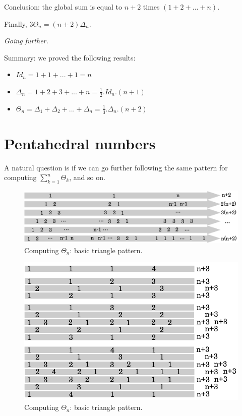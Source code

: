 Conclusion:
the global sum is equal to $n+2$ times $(1+2+...+n)$.

Finally, $3 \Theta_n = (n+2) \Delta_n$.
\medskip

\noindent \textit{Going further.}

Summary: we proved the following results:
\begin{itemize}
\item $Id_n = 1+1+ ... +1 = n$
\item $\Delta_n = 1+2+3+ ... +n = \frac{1}{2}.Id_n.(n+1)$
\item $\Theta_n = \Delta_1 + \Delta_2 + ... + \Delta_n = \frac{1}{3} .\Delta_n.(n+2)$
\end{itemize}


\section{Pentahedral numbers}

A natural question is if we can go further following the same pattern for computing 
$ \sum_{k=1}^{n} \Theta_k$, and so on.

\begin{figure}[h]
\begin{center}
        \includegraphics[scale=0.3]{FiguresArithmetic/appTetrahedral4}
        \caption{Computing $\Theta_n$: basic triangle pattern.}
        \label{fig:Tetrahedral4}
\end{center}
\end{figure}

\begin{figure}[h]
\begin{center}
        \includegraphics[scale=0.4]{FiguresArithmetic/appTetrahedral5}
        \caption{Computing $\Theta_n$: basic triangle pattern.}
        \label{fig:Tetrahedral5}
\end{center}
\end{figure}

